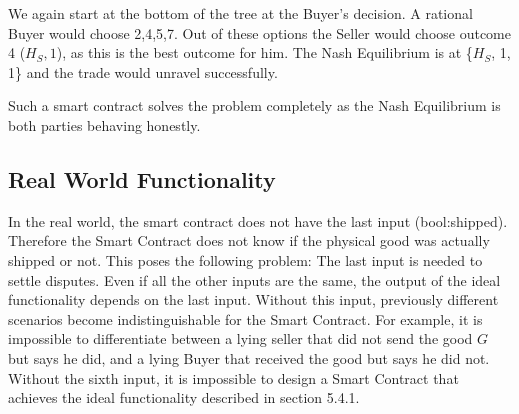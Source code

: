 \documentclass{cacthesis}
\begin{document}
We again start at the bottom of the tree at the Buyer's decision. A rational Buyer would choose 2,4,5,7. Out of these options the Seller would choose outcome 4 ($H_S,1$), as this is the best outcome for him.\newline
The Nash Equilibrium is at \{$H_S$, 1, 1\} and the trade would unravel successfully.\newline

Such a smart contract solves the problem completely as the Nash Equilibrium is both parties behaving honestly.
\subsection{Real World Functionality}
In the real world, the smart contract does not have the last input (bool:shipped). Therefore the Smart Contract does not know if the physical good was actually shipped or not. \newline
This poses the following problem: The last input is needed to settle disputes. Even if all the other inputs are the same, the output of the ideal functionality depends on the last input. Without this input, previously different scenarios become indistinguishable for the Smart Contract.\newline
For example, it is impossible to differentiate between a lying seller that did not send the good $G$ but says he did, and a lying Buyer that received the good but says he did not.\newline 
Without the sixth input, it is impossible to design a Smart Contract that achieves the ideal functionality described in section 5.4.1.
\end{document}
